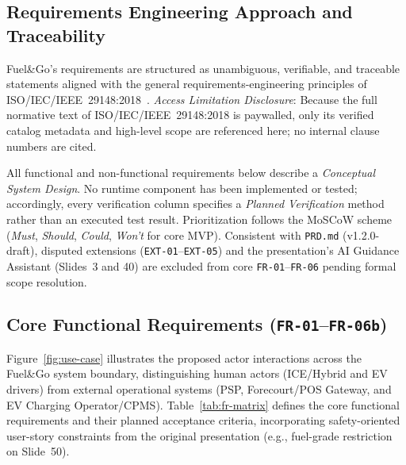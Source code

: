 

\subsection{Requirements Engineering Approach and Traceability}
\label{sec:req-approach}

Fuel\&Go's requirements are structured as unambiguous, verifiable, and traceable statements aligned with the general requirements-engineering principles of ISO/IEC/IEEE~29148:2018~\cite{iso29148_2018}. \emph{Access Limitation Disclosure}: Because the full normative text of ISO/IEC/IEEE~29148:2018 is paywalled, only its verified catalog metadata and high-level scope are referenced here; no internal clause numbers are cited.

All functional and non-functional requirements below describe a \emph{Conceptual System Design}. No runtime component has been implemented or tested; accordingly, every verification column specifies a \emph{Planned Verification} method rather than an executed test result. Prioritization follows the MoSCoW scheme (\emph{Must}, \emph{Should}, \emph{Could}, \emph{Won't} for core MVP). Consistent with \texttt{PRD.md} (v1.2.0-draft), disputed extensions (\texttt{EXT-01}--\texttt{EXT-05}) and the presentation's AI Guidance Assistant (Slides~3 and 40) are excluded from core \texttt{FR-01}--\texttt{FR-06} pending formal scope resolution.

\subsection{Core Functional Requirements (\texttt{FR-01}--\texttt{FR-06b})}
\label{sec:fr}

Figure~\ref{fig:use-case} illustrates the proposed actor interactions across the Fuel\&Go system boundary, distinguishing human actors (ICE/Hybrid and EV drivers) from external operational systems (PSP, Forecourt/POS Gateway, and EV Charging Operator/CPMS). Table~\ref{tab:fr-matrix} defines the core functional requirements and their planned acceptance criteria, incorporating safety-oriented user-story constraints from the original presentation (e.g., fuel-grade restriction on Slide~50).


